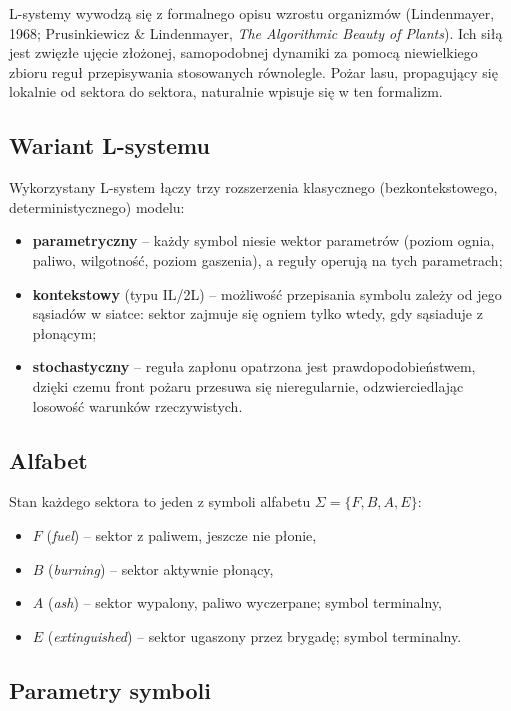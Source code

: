 \documentclass[11pt,a4paper]{article}
\begin{document}
L-systemy wywodzą się z formalnego opisu wzrostu organizmów (Lindenmayer, 1968; Prusinkiewicz \& Lindenmayer, \textit{The Algorithmic Beauty of Plants}). Ich siłą jest zwięzłe ujęcie złożonej, samopodobnej dynamiki za pomocą niewielkiego zbioru reguł przepisywania stosowanych równolegle. Pożar lasu, propagujący się lokalnie od sektora do sektora, naturalnie wpisuje się w ten formalizm.

\subsection{Wariant L-systemu}

Wykorzystany L-system łączy trzy rozszerzenia klasycznego (bezkontekstowego, deterministycznego) modelu:
\begin{itemize}
  \item \textbf{parametryczny} -- każdy symbol niesie wektor parametrów (poziom ognia, paliwo, wilgotność, poziom gaszenia), a reguły operują na tych parametrach;
  \item \textbf{kontekstowy} (typu IL/2L) -- możliwość przepisania symbolu zależy od jego sąsiadów w siatce: sektor zajmuje się ogniem tylko wtedy, gdy sąsiaduje z płonącym;
  \item \textbf{stochastyczny} -- reguła zapłonu opatrzona jest prawdopodobieństwem, dzięki czemu front pożaru przesuwa się nieregularnie, odzwierciedlając losowość warunków rzeczywistych.
\end{itemize}

\subsection{Alfabet}

Stan każdego sektora to jeden z symboli alfabetu $\Sigma = \{F, B, A, E\}$:
\begin{itemize}
  \item $F$ (\textit{fuel}) -- sektor z paliwem, jeszcze nie płonie,
  \item $B$ (\textit{burning}) -- sektor aktywnie płonący,
  \item $A$ (\textit{ash}) -- sektor wypalony, paliwo wyczerpane; symbol terminalny,
  \item $E$ (\textit{extinguished}) -- sektor ugaszony przez brygadę; symbol terminalny.
\end{itemize}

\subsection{Parametry symboli}
\end{document}
